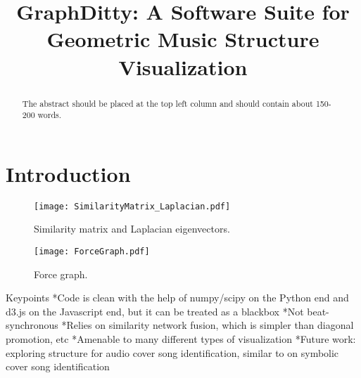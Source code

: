 \documentclass{article}
\title{GraphDitty: A Software Suite for Geometric Music Structure Visualization}
\begin{document}
%
\maketitle
%
\begin{abstract}
The abstract should be placed at the top left column and should contain about 150-200 words.
\end{abstract}
%
\section{Introduction}\label{sec:introduction}


\begin{figure}
 \texttt{[image: SimilarityMatrix\_Laplacian.pdf]}
 \caption{Similarity matrix and Laplacian eigenvectors.}
 \label{fig:example}
\end{figure}


\begin{figure}
 \texttt{[image: ForceGraph.pdf]}
 \caption{Force graph.}
 \label{fig:example}
\end{figure}

Keypoints
*Code is clean with the help of numpy/scipy on the Python end and d3.js on the Javascript end, but it can be treated as a blackbox
*Not beat-synchronous
*Relies on similarity network fusion, which is simpler than diagonal promotion, etc
*Amenable to many different types of visualization
*Future work: exploring structure for audio cover song identification, similar to \cite{kinnaird2016aligned} on symbolic cover song identification


\end{document}
